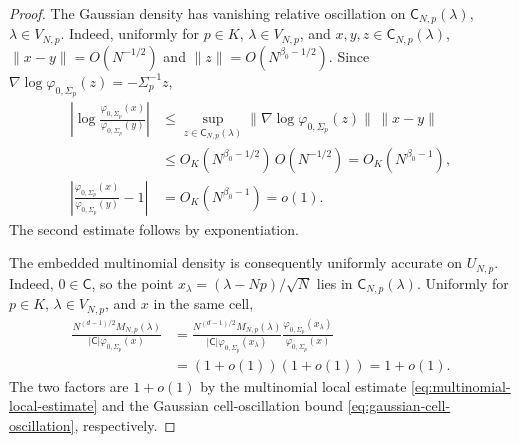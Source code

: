 \documentclass[11pt]{article}
\theoremstyle{remark}
\theoremstyle{plain}
\begin{document}
\begin{proof}
The Gaussian density has vanishing relative oscillation on
\(\mathsf C_{N,p}(\lambda)\), \(\lambda\in V_{N,p}\).
Indeed, uniformly for \(p\in K\), \(\lambda\in V_{N,p}\), and
\(x,y,z\in\mathsf C_{N,p}(\lambda)\),
\(\|x-y\|=O(N^{-1/2})\) and
\(\|z\|=O(N^{\beta_0-1/2})\).
Since \(\nabla\log\varphi_{0,\Sigma_p}(z)=-\Sigma_p^{-1}z\),
\begin{equation}\label{eq:gaussian-cell-oscillation}
\begin{aligned}
  \left|\log\frac{\varphi_{0,\Sigma_p}(x)}
                       {\varphi_{0,\Sigma_p}(y)}\right|
  &\le \sup_{z\in\mathsf C_{N,p}(\lambda)}
      \|\nabla\log\varphi_{0,\Sigma_p}(z)\|\,\|x-y\|\\
  &\le O_K(N^{\beta_0-1/2})\,O(N^{-1/2})
   =O_K(N^{\beta_0-1}),\\
  \left|\frac{\varphi_{0,\Sigma_p}(x)}
                   {\varphi_{0,\Sigma_p}(y)}-1\right|
  &=O_K(N^{\beta_0-1})=o(1).
\end{aligned}
\end{equation}
The second estimate follows by exponentiation.

The embedded multinomial density is consequently uniformly accurate on
\(U_{N,p}\).  Indeed, \(0\in\mathsf C\), so the point
\(x_\lambda=(\lambda-Np)/\sqrt N\) lies in
\(\mathsf C_{N,p}(\lambda)\).  Uniformly for \(p\in K\),
\(\lambda\in V_{N,p}\), and \(x\) in the same cell,
\begin{equation}\label{eq:embedded-multinomial-cellwise}
\begin{aligned}
  \frac{N^{(d-1)/2}M_{N,p}(\lambda)}
       {|\mathsf C|\varphi_{0,\Sigma_p}(x)}
  &=\frac{N^{(d-1)/2}M_{N,p}(\lambda)}
          {|\mathsf C|\varphi_{0,\Sigma_p}(x_\lambda)}
    \frac{\varphi_{0,\Sigma_p}(x_\lambda)}
         {\varphi_{0,\Sigma_p}(x)}\\
  &=(1+o(1))(1+o(1))=1+o(1).
\end{aligned}
\end{equation}
The two factors are \(1+o(1)\) by the multinomial local
estimate \eqref{eq:multinomial-local-estimate} and the Gaussian
cell-oscillation bound \eqref{eq:gaussian-cell-oscillation}, respectively.


\end{proof}
\end{document}
